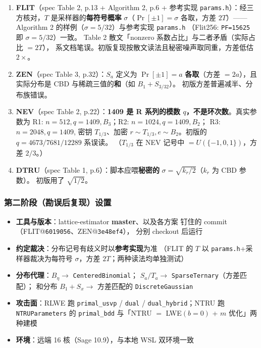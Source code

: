 \documentclass[11pt,a4paper]{ctexart}
\begin{document}
\begin{enumerate}
\item \textbf{FLIT}（spec Table 2, p.13 + Algorithm 2, p.6 + 参考实现
      \texttt{params.h}）：经三方核对，$T$ 是采样器的\textbf{每符号概率}
      $\sigma$（$\Pr[\pm 1]{=}\sigma$ 各取，方差 $2T$）——Algorithm 2
      的样例（$\sigma{=}5/32$）与参考实现 \texttt{params.h}
      （Flit256: \texttt{PF=15625} 即 $\sigma{=}5/32$）一致。
      Table 2 散文「nonzero 系数占比」与二者矛盾（实际占比 $=2T$），
      系文档笔误。初版复现按散文读法且秘密噪声取同重，方差低估 $2\times$。
\item \textbf{ZEN}（spec Table 3, p.32）：$S_a$ 定义为
      $\Pr[\pm 1]{=}a$ \textbf{各取}（方差 $= 2a$），且实际分布是
      CBD 与稀疏三值的\textbf{和}（如 $B_1{+}S_{3/32}$）。
      初版方差普遍减半、分布族错误。
\item \textbf{NEV}（spec Table 2, p.22）：\textbf{1409 是 R 系列的模数
      $q$，不是环次数}。真实参数为
      R1: $n{=}512,q{=}1409,B_3$；R2: $n{=}1024,q{=}1409,B_2$；
      R3: $n{=}2048,q{=}1409$, 密钥 $T_{1/3}$、加密 $r{\sim}T_{1/3},
      e{\sim}B_2$。初版的 $q{=}4673/7681/12289$ 系误读。
      （$T_{1/3}$ 在 NEV 记号中 $= U(\{-1,0,1\})$，方差 $2/3$。）
\item \textbf{DTRU}（spec Table 1, p.6）：脚本应喂\textbf{秘密的}
      $\sigma{=}\sqrt{k_r/2}$（$k_r$ 为 CBD 参数）。
      初版用了 $\sqrt{1/2}$。
\end{enumerate}

\subsubsection{第二阶段（勘误后复现）设置}

\begin{itemize}
\item \textbf{工具与版本}：lattice-estimator \textbf{master}、以及各方案
      钉住的 commit（FLIT@\texttt{6019056}、ZEN@\texttt{3e48ef4}），
      分别 checkout 后运行
\item \textbf{约定裁决}：分布记号有歧义时以\textbf{参考实现}为准
      （FLIT 的 $T$ 以 \texttt{params.h}+采样器裁决为每符号
      $\sigma$，方差 $2T$；两种读法均单独测试）
\item \textbf{分布代理}：$B_\eta \to$ \texttt{CenteredBinomial}；
      $S_a/T_a \to$ \texttt{SparseTernary}（方差匹配）；
      和分布 $B_1{+}S_x \to$ 方差匹配的 \texttt{DiscreteGaussian}
\item \textbf{攻击面}：RLWE 跑 \texttt{primal\_usvp} / \texttt{dual} /
      \texttt{dual\_hybrid}；NTRU 跑 \texttt{NTRUParameters} 的
      \texttt{primal\_bdd} 与「NTRU $=$ LWE$(b{=}0)$ + $m$ 优化」两种建模
\item \textbf{环境}：远端 16 核（Sage 10.9），与本地 WSL 双环境一致
\end{itemize}
\end{document}
